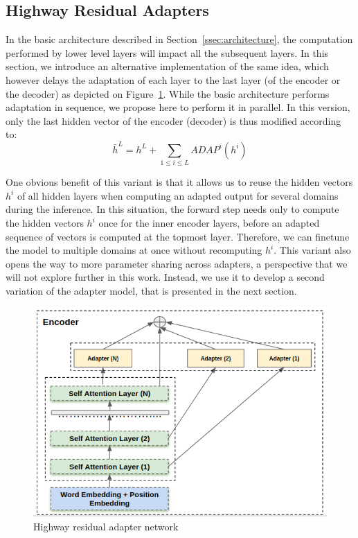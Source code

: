 \documentclass[11pt,a4paper]{article}
\begin{document}
\subsection{Highway Residual Adapters \label{ssec:highway}}

In the basic architecture described in Section~\ref{ssec:architecture}, the computation performed by lower level layers will impact all the subsequent layers. In this section, we introduce an alternative implementation of the same idea, which however delays the adaptation of each layer to the last layer (of the encoder or the decoder) as depicted on Figure~\ref{fig:hrl-architecture}. While the basic architecture performs adaptation in sequence, we propose here to perform it in parallel. In this version, only the last hidden vector of the encoder (decoder) is thus modified according to:
\begin{equation}
  \bar{h}^L = h^L + \displaystyle{\mathop{\sum}_{1 \leq i \leq L} ADAP^i(h^i)} \label{eq:highway-output}
\end{equation}

One obvious benefit of this variant is that it allows us to reuse the hidden vectors $h^i$ of all hidden layers when computing an adapted output for several domains during the inference. In this situation, the forward step needs only to compute the hidden vectors $h^i$ once for the inner encoder layers, before an adapted sequence of vectors is computed at the topmost layer. Therefore, we can finetune the model to multiple domains at once without recomputing $h^i$. This variant also opens the way to more parameter sharing across adapters, a perspective that we will not explore further in this work. Instead, we use it to develop a second variation of the adapter model, that is presented in the next section.

\begin{figure}[htbp]
  \centering
  \includegraphics[scale=0.3]{fig/highway_residual}
  \caption{Highway residual adapter network}
  \label{fig:hrl-architecture}
\end{figure}
\end{document}

